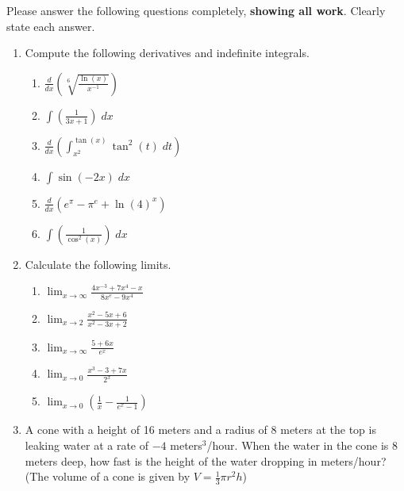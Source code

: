 \documentclass[11pt]{article}
\newcommand{\ds}{\displaystyle}
\begin{document}
\drawtitle

\noindent Please answer the following questions completely,
\textbf{showing all work}.  Clearly state each answer.

\begin{enumerate}
\item Compute the following derivatives and indefinite integrals.
  \begin{enumerate}
  \item $\ds\frac{d}{dx}\left(\sqrt[6]{\frac{\ln(x)}{x^{-1}}}\right)$
    \vfill
  \item $\ds\int\left(\frac{1}{3x+1}\right)\;dx$
    \vfill
    \newpage
  \item $\ds\frac{d}{dx}\left(\int_{x^2}^{\tan(x)}\tan^2(t)\;dt\right)$ \vfill
  \item $\ds\int\sin\left(-2x\right)\;dx$
    \vfill
    \newpage
  \item $\ds\frac{d}{dx}\left(e^{\pi}-\pi^e+\ln(4)^x\right)$
    \vfill
  \item $\ds\int\left(\frac{1}{\cos^2(x)}\right)\;dx$
    \vfill
  \end{enumerate}

  \newpage

\item Calculate the following limits.
  \begin{enumerate}
  \item $\ds\lim_{x\to \infty}\frac{4x^{-3}+7x^4-x}{8x^e-9x^4}$ \vfill
  \item $\ds\lim_{x\to 2}\frac{x^2-5x+6}{x^2-3x+2}$ \vfill
  \item $\ds\lim_{x\to \infty}\frac{5+6x}{e^x}$ \vfill\newpage
  \item $\ds\lim_{x\to 0}\frac{x^3-3+7x}{2^x}$ \vfill
  \item $\ds\lim_{x\to 0}\left(\frac{1}{x}-\frac{1}{e^x-1}\right)$ \vfill
  \end{enumerate}
  
  \newpage

\item A cone with a height of 16 meters and a radius of 8 meters at
  the top is leaking water at a rate of $-4$ meters$^3$/hour.  When
  the water in the cone is 8 meters deep, how fast is the height of
  the water dropping in meters/hour? (The volume of a cone is given by
  $V=\frac{1}{3}\pi r^2 h$)

  \newpage


\end{enumerate}
\end{document}
